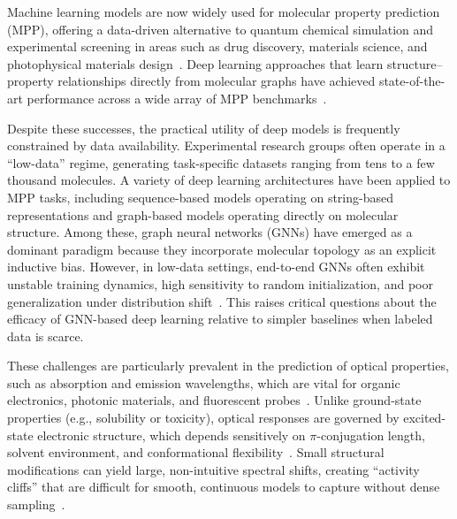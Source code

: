 Machine learning models are now widely used for molecular property prediction (MPP), offering a data-driven alternative to quantum chemical simulation and experimental screening in areas such as drug discovery, materials science, and photophysical materials design~\cite{butler2018machine, schneider2020rethinking, jha2018elemnet}. Deep learning approaches that learn structure–property relationships directly from molecular graphs have achieved state-of-the-art performance across a wide array of MPP benchmarks~\cite{ying2021transformers, hu2020open, gasteiger2020directional}.

Despite these successes, the practical utility of deep models is frequently constrained by data availability. Experimental research groups often operate in a ``low-data'' regime, generating task-specific datasets ranging from tens to a few thousand molecules. A variety of deep learning architectures have been applied to MPP tasks, including sequence-based models operating on string-based representations and graph-based models operating directly on molecular structure. Among these, graph neural networks (GNNs) have emerged as a dominant paradigm because they incorporate molecular topology as an explicit inductive bias. However, in low-data settings, end-to-end GNNs often exhibit unstable training dynamics, high sensitivity to random initialization, and poor generalization under distribution shift~\cite{chuang2020debiased, grinsztajn2022tree}. This raises critical questions about the efficacy of GNN-based deep learning relative to simpler baselines when labeled data is scarce.

These challenges are particularly prevalent in the prediction of optical properties, such as absorption and emission wavelengths, which are vital for organic electronics, photonic materials, and fluorescent probes~\cite{facchetti2011pi}. Unlike ground-state properties (e.g., solubility or toxicity), optical responses are governed by excited-state electronic structure, which depends sensitively on $\pi$-conjugation length, solvent environment, and conformational flexibility~\cite{lakowicz2006principles, martin2020electronic, reichardt2011solvents}. Small structural modifications can yield large, non-intuitive spectral shifts, creating ``activity cliffs'' that are difficult for smooth, continuous models to capture without dense sampling~\cite{van2022exposing}.

